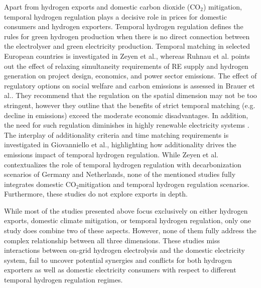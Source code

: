 \documentclass[5p,numafflabel]{elsarticle}
\newcommand{\co}{\ce{CO2}~}
\def\co{CO${}_2${\:}}
\begin{document}
Apart from hydrogen exports and domestic carbon dioxide (CO${}_2$) mitigation, temporal hydrogen regulation plays a decisive role in prices for domestic consumers and hydrogen exporters. 
Temporal hydrogen regulation defines the rules for green hydrogen production when there is no direct connection between the electrolyser and green electricity production.
Temporal matching in selected European countries is investigated in Zeyen et al.\cite{Zeyen2024}, whereas Ruhnau et al.\cite{Ruhnau2023} points out the effect of relaxing simultaneity requirements of RE supply and hydrogen generation on project design, economics, and power sector emissions.
The effect of regulatory options on social welfare and carbon emissions is assessed in Brauer et al.\cite{Brauer2022}. They recommend that the regulation on the spatial dimension may not be too stringent, however they outline that the benefits of strict temporal matching (e.g. decline in emissions) exceed the moderate economic disadvantages. In addition, the need for such regulation diminishes in highly renewable electricity systems \cite{Brauer2022}.
The interplay of additionality criteria and time matching requirements is investigated in Giovanniello et al.\cite{Giovanniello2024}, highlighting how additionality drives the emissions impact of temporal hydrogen regulation.
While Zeyen et al.\cite{Zeyen2024} contextualizes the role of temporal hydrogen regulation with decarbonization scenarios of Germany and Netherlands, none of the mentioned studies fully integrates domestic \co mitigation and temporal hydrogen regulation scenarios. Furthermore, these studies do not explore exports in depth.

While most of the studies presented above focus exclusively on either hydrogen exports, domestic climate mitigation, or temporal hydrogen regulation, only one study\cite{Muller2024} does combine two of these aspects. However, none of them fully address the complex relationship between all three dimensions. 
These studies miss interactions between on-grid hydrogen electrolysis and the domestic electricity system, fail to uncover potential synergies and conflicts for both hydrogen exporters as well as domestic electricity consumers with respect to different temporal hydrogen regulation regimes.
\end{document}
